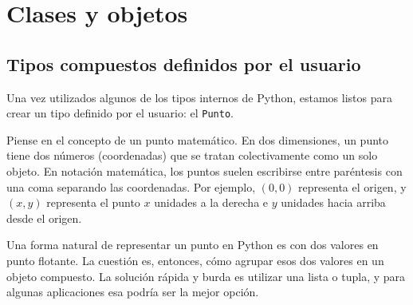 


\chapter{Clases y objetos}


\section{Tipos compuestos definidos por el usuario}
\label{point}

Una vez utilizados algunos de los tipos internos de Python, estamos listos
para crear un tipo definido por el usuario: el \texttt{Punto}.

Piense en el concepto de un punto matemático. En dos dimensiones, un punto
tiene dos números (coordenadas) que se tratan colectivamente como un solo
objeto. En notación matemática, los puntos suelen escribirse entre
paréntesis con una coma separando las coordenadas. Por ejemplo, $(0, 0)$
representa el origen, y $(x, y)$ representa el punto $x$ unidades a la
derecha e $y$ unidades hacia arriba desde el origen.

Una forma natural de representar un punto en Python es con dos valores en
punto flotante. La cuestión es, entonces, cómo agrupar esos dos valores en
un objeto compuesto. La solución rápida y burda es utilizar una lista o
tupla, y para algunas aplicaciones esa podría ser la mejor opción.

